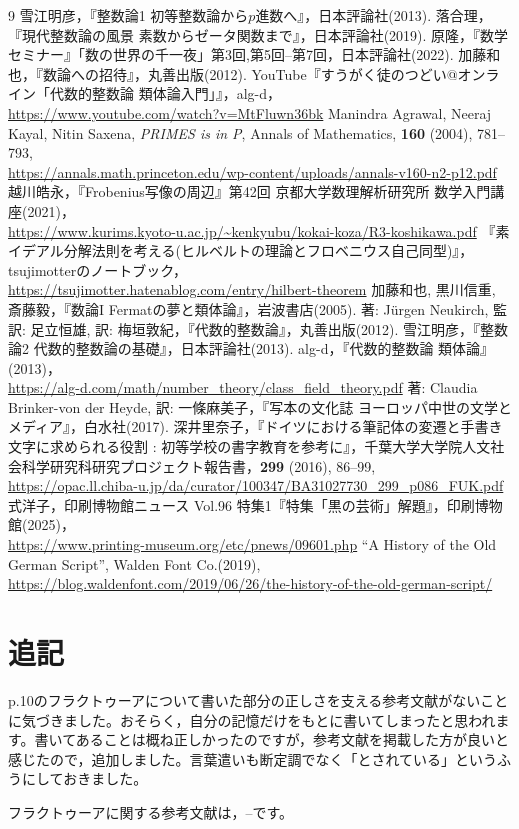 \begin{thebibliography}{9}
     雪江明彦，『整数論1 初等整数論から$p$進数へ』，日本評論社(2013).
     落合理，『現代整数論の風景 素数からゼータ関数まで』，日本評論社(2019).
     原隆，『数学セミナー』「数の世界の千一夜」第3回,第5回--第7回，日本評論社(2022).
     加藤和也，『数論への招待』，丸善出版(2012).
     YouTube『すうがく徒のつどい@オンライン「代数的整数論 類体論入門」』，alg-d，\\
    \url{https://www.youtube.com/watch?v=MtFluwn36bk}
     Manindra Agrawal, Neeraj Kayal, Nitin Saxena, \emph{PRIMES is in P}, Annals of Mathematics, \textbf{160} (2004), 781--793,\\
    \url{https://annals.math.princeton.edu/wp-content/uploads/annals-v160-n2-p12.pdf}
     越川皓永，『Frobenius写像の周辺』第42回 京都大学数理解析研究所 数学入門講座(2021)，\\
    \url{https://www.kurims.kyoto-u.ac.jp/~kenkyubu/kokai-koza/R3-koshikawa.pdf}
     『素イデアル分解法則を考える(ヒルベルトの理論とフロベニウス自己同型)』，tsujimotterのノートブック，\\
    \url{https://tsujimotter.hatenablog.com/entry/hilbert-theorem}
     加藤和也, 黒川信重, 斎藤毅，『数論I Fermatの夢と類体論』，岩波書店(2005).
     著: Jürgen Neukirch, 監訳: 足立恒雄, 訳: 梅垣敦紀，『代数的整数論』，丸善出版(2012).
     雪江明彦，『整数論2 代数的整数論の基礎』，日本評論社(2013).
     alg-d，『代数的整数論 類体論』(2013)，\\
    \url{https://alg-d.com/math/number\_theory/class\_field\_theory.pdf}
     著: Claudia Brinker-von der Heyde, 訳: 一條麻美子，『写本の文化誌 ヨーロッパ中世の文学とメディア』，白水社(2017).
     深井里奈子，『ドイツにおける筆記体の変遷と手書き文字に求められる役割 : 初等学校の書字教育を参考に』，千葉大学大学院人文社会科学研究科研究プロジェクト報告書，\textbf{299} (2016), 86--99,\\
    \url{https://opac.ll.chiba-u.jp/da/curator/100347/BA31027730_299_p086_FUK.pdf}
     式洋子，印刷博物館ニュース Vol.96 特集1『特集「黒の芸術」解題』，印刷博物館(2025)，\\
    \url{https://www.printing-museum.org/etc/pnews/09601.php}
     ``A History of the Old German Script'', Walden Font Co.(2019),\\
    \url{https://blog.waldenfont.com/2019/06/26/the-history-of-the-old-german-script/}
\end{thebibliography}

\section{追記}
p.10のフラクトゥーアについて書いた部分の正しさを支える参考文献がないことに気づきました。おそらく，自分の記憶だけをもとに書いてしまったと思われます。書いてあることは概ね正しかったのですが，参考文献を掲載した方が良いと感じたので，追加しました。言葉遣いも断定調でなく「とされている」というふうにしておきました。

フラクトゥーアに関する参考文献は，\cite{manuscr}--\cite{frak3}です。